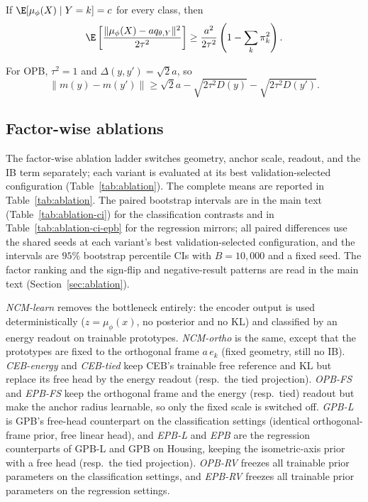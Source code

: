 \begin{proposition}
\label{prop:opb-collapse}
If $\E[\mu_\phi(X)\mid Y=k]=c$ for every class, then
\begin{equation}
\E\left[\frac{\|\mu_\phi(X)-a q_{\theta,Y}\|^2}{2\tau^2}\right]
\ge\frac{a^2}{2\tau^2}\left(1-\sum_k\pi_k^2\right).
\label{eq:opb-collapse}
\end{equation}
\end{proposition}

\begin{corollary}
\label{prop:opb-separation}
For OPB, $\tau^2=1$ and $\Delta(y,y')=\sqrt2a$, so
\begin{equation}
\|m(y)-m(y')\|\ge\sqrt2a-\sqrt{2\tau^2D(y)}-\sqrt{2\tau^2D(y')}.
\label{eq:opb-separation}
\end{equation}
\end{corollary}

\subsection{Factor-wise ablations}
\label{app:ablation}
The factor-wise ablation ladder switches geometry, anchor scale, readout, and the IB
term separately; each variant is evaluated at its best validation-selected
configuration (Table~\ref{tab:ablation}). The complete means are reported in
Table~\ref{tab:ablation}. The paired bootstrap intervals are in the main text
(Table~\ref{tab:ablation-ci}) for the classification contrasts and in
Table~\ref{tab:ablation-ci-epb} for the regression mirrors; all paired differences
use the shared seeds at each variant's best validation-selected configuration,
and the intervals are $95\%$ bootstrap percentile CIs with $B=10{,}000$ and a fixed
seed. The factor ranking and
the sign-flip and negative-result patterns are read in the main text
(Section~\ref{sec:ablation}).

\emph{NCM-learn} removes the bottleneck entirely: the encoder output is used
deterministically ($z=\mu_\phi(x)$, no posterior and no KL) and classified by an
energy readout on trainable prototypes. \emph{NCM-ortho} is the same, except that
the prototypes are fixed to the orthogonal frame $a\,e_k$ (fixed geometry, still no
IB). \emph{CEB-energy} and \emph{CEB-tied} keep CEB's trainable free reference and
KL but replace its free head by the energy readout (resp.\ the tied projection).
\emph{OPB-FS} and \emph{EPB-FS} keep the orthogonal frame and the energy (resp.\
tied) readout but make the anchor radius learnable, so only the fixed scale is
switched off. \emph{GPB-L} is GPB's free-head counterpart on the classification
settings (identical orthogonal-frame prior, free linear head), and \emph{EPB-L}
and \emph{EPB} are the regression counterparts of GPB-L and GPB on Housing,
keeping the isometric-axis prior with a free head (resp.\ the tied projection).
\emph{OPB-RV} freezes all trainable prior parameters on the classification
settings, and \emph{EPB-RV} freezes all trainable prior parameters on the
regression settings.

